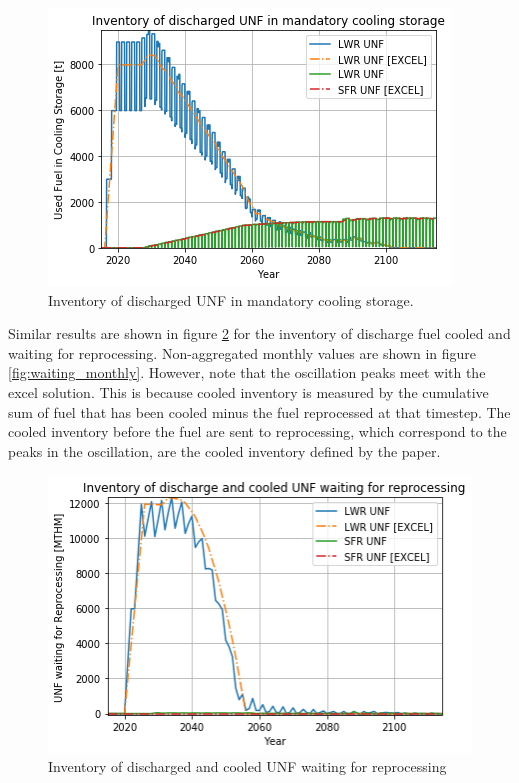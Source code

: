\begin{figure}[htbp!]
    \begin{center}
        \includegraphics[scale=0.6]{./images/results_18/fuel_discharge_monthly.png}
    \end{center}
        \caption{Inventory of discharged \gls{UNF} in mandatory cooling storage.}
    \label{fig:fuel_discharge_monthly}
\end{figure}


Similar results are shown in figure \ref{fig:waiting} for the inventory of discharge fuel cooled and waiting
for reprocessing. Non-aggregated monthly values are shown in figure \ref{fig:waiting_monthly}.
However, note that the oscillation peaks meet with the excel
solution.  This is because cooled inventory is measured by the cumulative sum
of fuel that has been cooled minus the fuel reprocessed at that timestep.
The cooled inventory before the fuel are sent to reprocessing, which correspond
to the peaks in the oscillation, are the cooled inventory defined by the paper.

\begin{figure}[htbp!]
    \begin{center}
        \includegraphics[scale=0.6]{./images/results_18/waiting.png}
    \end{center}
        \caption{Inventory of discharged and cooled \gls{UNF} waiting for reprocessing}
    \label{fig:waiting}
\end{figure}

